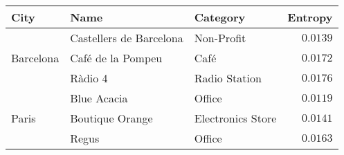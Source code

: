\begin{table}[ht]
	\centering
\begin{tabular}{lllr}
	\toprule
	City                       & Name                           & Category                 & Entropy \\
	\midrule
	\multirow{3}{*}{Barcelona} & Castellers de Barcelona        & Non-Profit               & $0.0139$ \\
	                           & Café de la Pompeu              & Café                     & $0.0172$ \\
	                           & Ràdio 4                        & Radio Station            & $0.0176$ \\
	\midrule
	\multirow{3}{*}{Paris}     & Blue Acacia                    & Office                   & $0.0119$ \\
	                           & Boutique Orange                & Electronics Store        & $0.0141$ \\
	                           & Regus                          & Office                   & $0.0163$ \\
	\midrule

\end{tabular}
\end{table}
